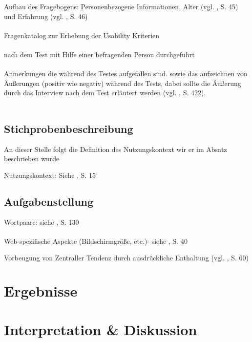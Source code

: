 \documentclass[Bachelorarbeit.tex]{subfiles}
\begin{document}

Aufbau des Fragebogens:
Personenbezogene Informationen, Alter (vgl. \cite{Ollermann2007}, S. 45) und Erfahrung (vgl. \cite{Ollermann2007}, S. 46)\\
\\
Fragenkatalog zur Erhebung der Usability Kriterien\\
\\
nach dem Test mit Hilfe einer befragenden Person durchgeführt\\
\\
Anmerkungen die während des Testes aufgefallen sind. sowie das aufzeichnen von Äußerungen (positiv wie negativ) während des Tests, dabei sollte die Äußerung durch das Interview nach dem Test erläutert werden (vgl. \cite{Niegemann2008}, S. 422).\\
\\



\subsection{Stichprobenbeschreibung}
\label{Stichproben}
An dieser Stelle folgt die Definition des Nutzungskontext wir er im Absatz  beschrieben wurde

Nutzungskontext: Siehe \cite{Ollermann2007}, S. 15



\subsection{Aufgabenstellung}
\label{Aufgabenstellung}

Wortpaare: siehe \cite{Laugwitz2006}, S. 130 \\
\\
Web-spezifische Aspekte (Bildschirmgröße, etc.)- siehe \cite{Ollermann2007}, S. 40

Vorbeugung von Zentraller Tendenz durch ausdrückliche Enthaltung (vgl. \cite{Ollermann2007}, S. 60)

\section{Ergebnisse}
\label{Ergebnisse}

\section{Interpretation \& Diskussion}
\label{InterpretationDiskussion}
\end{document}
